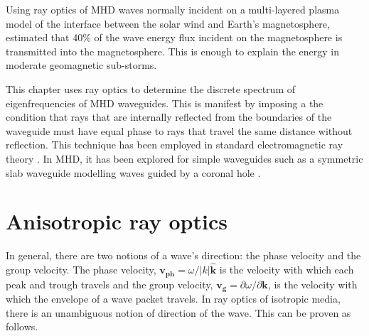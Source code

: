 \documentclass[12pt]{../style-files/ociamthesis}
\begin{document}
	Using ray optics of MHD waves normally incident on a multi-layered plasma model of the interface between the solar wind and Earth's magnetosphere, \cite{leo_etal03} estimated that 40\% of the wave energy flux incident on the magnetosphere is transmitted into the magnetosphere. This is enough to explain the energy in moderate geomagnetic sub-storms.
	
	This chapter uses ray optics to determine the discrete spectrum of eigenfrequencies of MHD waveguides. This is manifest by imposing a the condition that rays that are internally reflected from the boundaries of the waveguide must have equal phase to rays that travel the same distance without reflection. This technique has been employed in standard electromagnetic ray theory \citep{bor_etal99}. In MHD, it has been explored for simple waveguides such as a symmetric slab waveguide modelling waves guided by a coronal hole \citep{dav_85}.
	
	
	\section{Anisotropic ray optics}
	\label{sec: aniso ray}
		
	In general, there are two notions of a wave's direction: the phase velocity and the group velocity. The phase velocity, $\mathbf{v_{ph}} = \omega / |k| \mathbf{\hat{k}}$ is the velocity with which each peak and trough travels and the group velocity, $\mathbf{v_g} = \partial \omega / \partial \mathbf{k}$, is the velocity with which the envelope of a wave packet travels. In ray optics of isotropic media, there is an unambiguous notion of direction of the wave. This can be proven as follows.
	
\end{document}
